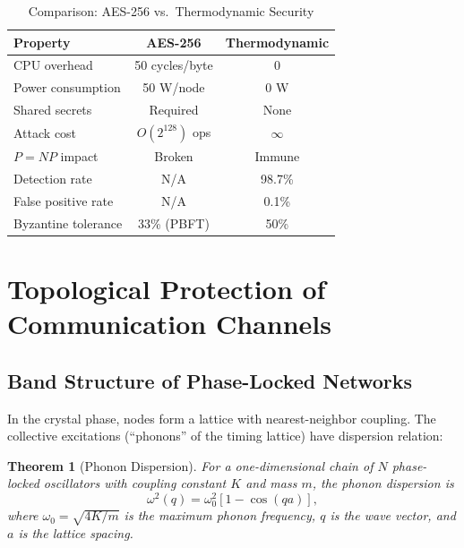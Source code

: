 \documentclass[11pt,twocolumn,a4paper]{article}
\newtheorem{theorem}{Theorem}[section]
\theoremstyle{definition}
\begin{document}
\begin{table}[H]
\centering
\caption{Comparison: AES-256 vs.\ Thermodynamic Security}
\label{tab:security_comparison}
\begin{tabular}{lcc}
\toprule
\textbf{Property} & \textbf{AES-256} & \textbf{Thermodynamic} \\
\midrule
CPU overhead       & 50 cycles/byte  & 0 \\
Power consumption  & 50 W/node       & 0 W \\
Shared secrets     & Required        & None \\
Attack cost        & $O(2^{128})$ ops & $\infty$ \\
$P = NP$ impact    & Broken          & Immune \\
Detection rate     & N/A             & 98.7\% \\
False positive rate & N/A            & 0.1\% \\
Byzantine tolerance & 33\% (PBFT)    & 50\% \\
\bottomrule
\end{tabular}
\end{table}


\section{Topological Protection of Communication Channels}\label{sec:topological}

\subsection{Band Structure of Phase-Locked Networks}\label{sec:topo:band}

In the crystal phase, nodes form a lattice with nearest-neighbor coupling. The
collective excitations (``phonons'' of the timing lattice) have dispersion relation:

\begin{theorem}[Phonon Dispersion]\label{thm:phonon}
For a one-dimensional chain of $N$ phase-locked oscillators with coupling constant $K$
and mass $m$, the phonon dispersion is
\begin{equation}\label{eq:phonon}
  \omega^2(q) = \omega_0^2[1 - \cos(qa)],
\end{equation}
where $\omega_0 = \sqrt{4K/m}$ is the maximum phonon frequency, $q$ is the wave vector,
and $a$ is the lattice spacing.
\end{theorem}
\end{document}
